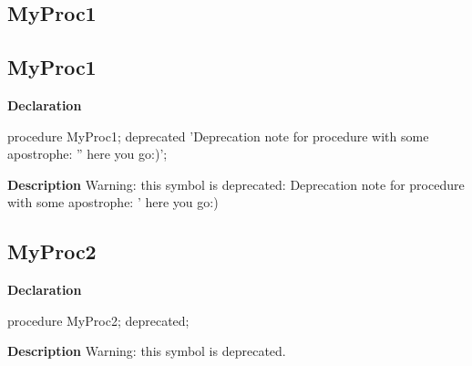 \documentclass{report}
\newif\ifpdf
\begin{document}
\subsection*{\large{\textbf{MyProc1}}\normalsize\hspace{1ex}\hrulefill}
\else
\subsection*{MyProc1}
\fi
\label{ok_deprecated_directive_note-MyProc1}
\begin{list}{}{
\setlength{\itemindent}{0cm}
\setlength{\listparindent}{0cm}
\setlength{\leftmargin}{\evensidemargin}
\addtolength{\leftmargin}{\tmplength}
\settowidth{\labelsep}{X}
\addtolength{\leftmargin}{\labelsep}
\setlength{\labelwidth}{\tmplength}
}
\item[\textbf{Declaration}\hfill]
\ifpdf
\begin{flushleft}
\fi
\begin{ttfamily}
procedure MyProc1; deprecated 'Deprecation note for procedure with some apostrophe: '' here you go:)';\end{ttfamily}

\ifpdf
\end{flushleft}
\fi

\par
\item[\textbf{Description}]
Warning: this symbol is deprecated: Deprecation note for procedure with some apostrophe: ' here you go:)

 

\end{list}
\ifpdf
\subsection*{\large{\textbf{MyProc2}}\normalsize\hspace{1ex}\hrulefill}
\else
\subsection*{MyProc2}
\fi
\label{ok_deprecated_directive_note-MyProc2}
\begin{list}{}{
\setlength{\itemindent}{0cm}
\setlength{\listparindent}{0cm}
\setlength{\leftmargin}{\evensidemargin}
\addtolength{\leftmargin}{\tmplength}
\settowidth{\labelsep}{X}
\addtolength{\leftmargin}{\labelsep}
\setlength{\labelwidth}{\tmplength}
}
\item[\textbf{Declaration}\hfill]
\ifpdf
\begin{flushleft}
\fi
\begin{ttfamily}
procedure MyProc2; deprecated;\end{ttfamily}

\ifpdf
\end{flushleft}
\fi

\par
\item[\textbf{Description}]
Warning: this symbol is deprecated.

 

\end{list}
\ifpdf
\end{document}
